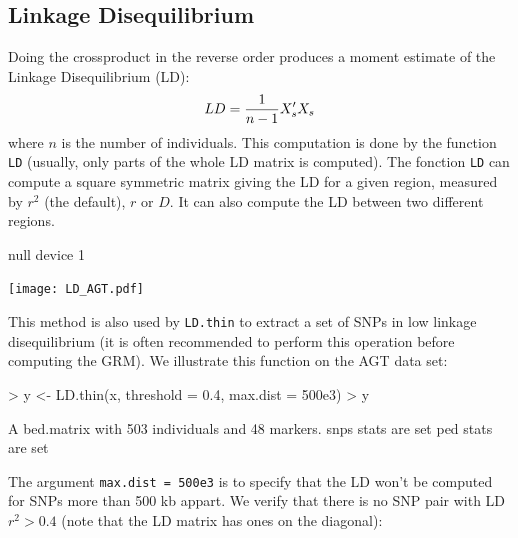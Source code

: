 \documentclass{article}
\renewenvironment{Schunk}{\vspace{\topsep}}{\vspace{\topsep}}
\begin{document}
\vfill\eject
\subsection{Linkage Disequilibrium}

  Doing the crossproduct in the reverse order produces a moment estimate of the 
  Linkage Disequilibrium (LD):
  \begin{equation*} 
    LD = {1\over n-1} X_s'X_s 
  \end{equation*}
  where $n$ is the number of individuals. This computation is done by the function
  \verb!LD! (usually, only parts of the whole LD matrix is computed).  
  The fonction \verb!LD! can compute a square symmetric matrix giving the LD for a given 
  region, measured by $r^2$ (the default), $r$ or $D$. It can also compute the LD  between
  two different regions.

\begin{center}
\begin{Schunk}
\begin{Soutput}
null device 
          1 
\end{Soutput}
\end{Schunk}
\texttt{[image: LD\_AGT.pdf]}
\end{center}

  This method is 
  also used by \verb!LD.thin! to extract a set of SNPs in low linkage disequilibrium
  (it is often recommended to perform this operation before computing the GRM). We illustrate
  this function on the AGT data set:

\begin{Schunk}
\begin{Sinput}
> y <- LD.thin(x, threshold = 0.4, max.dist = 500e3)
> y
\end{Sinput}
\begin{Soutput}
A bed.matrix with 503 individuals and 48 markers.
snps stats are set
ped stats are set
\end{Soutput}
\end{Schunk}

The argument \verb!max.dist = 500e3! is to specify that the LD won't be computed for
SNPs more than 500 kb appart. We verify that there is no SNP pair with LD $r^2 > 0.4$
(note that the LD matrix has ones on the diagonal):
\end{document}
